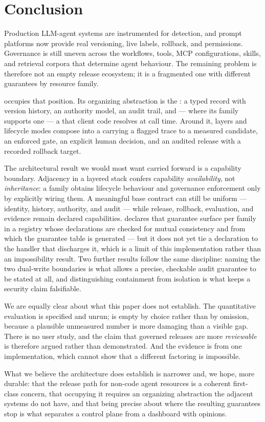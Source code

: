 \section{Conclusion}
\label{sec:conclusion}

Production LLM-agent systems are instrumented for detection, and prompt platforms
now provide real versioning, live labels, rollback, and permissions. Governance is
still uneven across the workflows, tools, MCP configurations, skills, and retrieval
corpora that determine agent behaviour. The remaining problem is therefore not an
empty release ecosystem; it is a fragmented one with different guarantees by
resource family.

\sys occupies that position. Its organizing abstraction is the \gasset: a typed
record with version history, an authority model, an audit trail, and --- where its
family supports one --- a \livetarget{} that client code resolves at call time.
Around it, \statLayersW{} layers and \statModesW{} lifecycle modes compose into a
\chainname{} carrying a flagged trace to a measured candidate, an enforced gate, an
explicit human decision, and an audited release with a recorded rollback target.

The architectural result we would most want carried forward is a capability
boundary. Adjacency in a layered stack confers capability \emph{availability}, not
\emph{inheritance}: a family obtains lifecycle behaviour and governance enforcement
only by explicitly wiring them. A meaningful base contract can still be uniform ---
identity, history, authority, and audit --- while release, rollback, evaluation, and
evidence remain declared capabilities. \sys declares that guarantee surface per
family in a registry whose declarations are checked for mutual consistency and from
which the guarantee table is generated --- but it does not yet tie a declaration to
the handler that discharges it, which is a limit of this implementation rather than
an impossibility result. Two further results follow
the same discipline: naming the two dual-write
boundaries is what allows a precise, checkable audit guarantee to be stated at all,
and distinguishing containment from isolation is what keeps a security claim
falsifiable.

We are equally clear about what this paper does not establish. The quantitative
evaluation is specified and unrun;  is empty by choice rather
than by omission, because a plausible unmeasured number is more damaging than a
visible gap. There is no user study, and the claim that governed releases are more
\emph{reviewable} is therefore argued rather than demonstrated. And the evidence is
from one implementation, which cannot show that a different factoring is impossible.

What we believe the architecture does establish is narrower and, we hope, more
durable: that the release path for non-code agent resources is a coherent
first-class concern, that occupying it requires an organizing abstraction the
adjacent systems do not have, and that being precise about where the resulting
guarantees stop is what separates a control plane from a dashboard with opinions.
